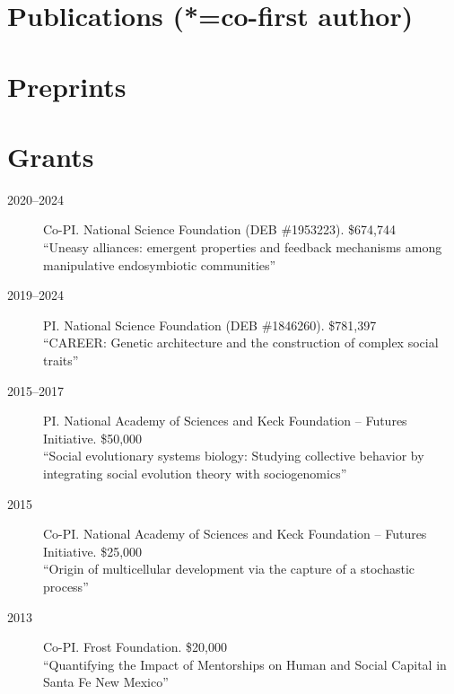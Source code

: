 \documentclass[11pt]{article}
\begin{document}
  \section{Publications {\small (*=co-first author)}}
  
  \begin{publist}
    
    
    
  \end{publist}
  
  \section{Preprints}
  
  \begin{publist}

    \item {}

    \item {}
    
    \item {}
        
    \item {}
    
  \end{publist}
  
  \section{Grants}
  \begin{description}
  \item[2020--2024] Co-PI. National Science Foundation (DEB \#1953223). \$674,744\\
    ``Uneasy alliances: emergent properties and feedback mechanisms among manipulative endosymbiotic communities''
  \item[2019--2024] PI. National Science Foundation (DEB \#1846260). \$781,397\\
    ``CAREER: Genetic architecture and the construction of complex social traits''
  \item[2015--2017] PI. National Academy of Sciences and Keck Foundation -- Futures Initiative. \$50,000\\
    ``Social evolutionary systems biology: Studying collective behavior by integrating social evolution theory with sociogenomics''
  \item[2015] Co-PI. National Academy of Sciences and Keck Foundation -- Futures Initiative. \$25,000\\
    ``Origin of multicellular development via the capture of a stochastic process''
  \item[2013] Co-PI. Frost Foundation. \$20,000 \\
    ``Quantifying the Impact of Mentorships on Human and Social Capital in Santa Fe New Mexico''
  \end{description}
  
\end{document}
